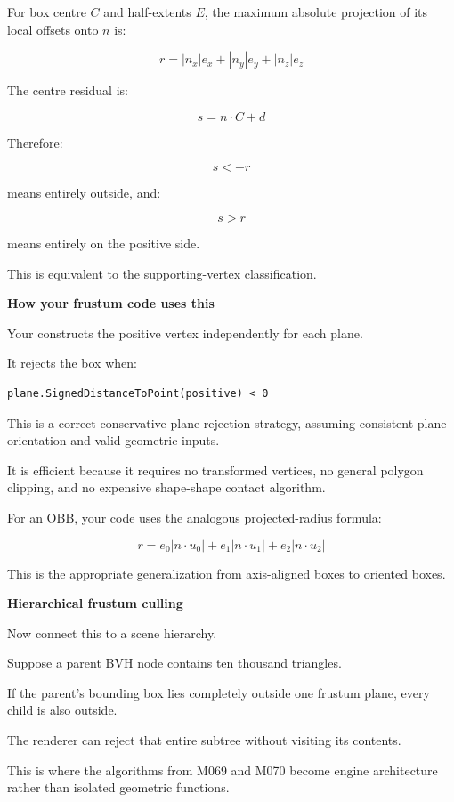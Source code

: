 For box centre \(C\) and half-extents \(E\), the maximum absolute projection of its local offsets onto \(n\) is:

\[
\boxed{ r=|n_x|e_x+|n_y|e_y+|n_z|e_z }
\]

The centre residual is:

\[
s=n\cdot C+d
\]

Therefore:

\[
s<-r
\]

means entirely outside, and:

\[
s>r
\]

means entirely on the positive side.

This is equivalent to the supporting-vertex classification.

\textbf{How your frustum code uses this}

Your  constructs the positive vertex independently for each plane.

It rejects the box when:

\begin{verbatim}
plane.SignedDistanceToPoint(positive) < 0
\end{verbatim}

This is a correct conservative plane-rejection strategy, assuming consistent plane orientation and valid geometric inputs.

It is efficient because it requires no transformed vertices, no general polygon clipping, and no expensive shape-shape contact algorithm.

For an OBB, your code uses the analogous projected-radius formula:

\[
r= e_0|n\cdot u_0| + e_1|n\cdot u_1| + e_2|n\cdot u_2|
\]

This is the appropriate generalization from axis-aligned boxes to oriented boxes.

\textbf{Hierarchical frustum culling}

Now connect this to a scene hierarchy.

Suppose a parent BVH node contains ten thousand triangles.

If the parent's bounding box lies completely outside one frustum plane, every child is also outside.

The renderer can reject that entire subtree without visiting its contents.

This is where the algorithms from M069 and M070 become engine architecture rather than isolated geometric functions.

